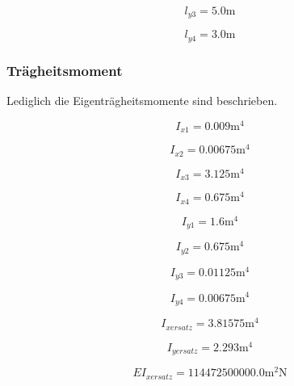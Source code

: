 \documentclass[
  letterpaper,
  DIV=11]{scrreprt}
\begin{document}
\begin{equation*}l_{y3} = 5.0 \text{m}\end{equation*}

\begin{equation*}l_{y4} = 3.0 \text{m}\end{equation*}

\hypertarget{truxe4gheitsmoment}{%
\subsubsection{Trägheitsmoment}\label{truxe4gheitsmoment}}

Lediglich die Eigenträgheitsmomente sind beschrieben.

\begin{equation*}I_{x1} = 0.009 \text{m}^{4}\end{equation*}

\begin{equation*}I_{x2} = 0.00675 \text{m}^{4}\end{equation*}

\begin{equation*}I_{x3} = 3.125 \text{m}^{4}\end{equation*}

\begin{equation*}I_{x4} = 0.675 \text{m}^{4}\end{equation*}

\begin{equation*}I_{y1} = 1.6 \text{m}^{4}\end{equation*}

\begin{equation*}I_{y2} = 0.675 \text{m}^{4}\end{equation*}

\begin{equation*}I_{y3} = 0.01125 \text{m}^{4}\end{equation*}

\begin{equation*}I_{y4} = 0.00675 \text{m}^{4}\end{equation*}

\begin{equation*}I_{x ersatz} = 3.81575 \text{m}^{4}\end{equation*}

\begin{equation*}I_{y ersatz} = 2.293 \text{m}^{4}\end{equation*}

\begin{equation*}EI_{x ersatz} = 114472500000.0 \text{m}^{2} \text{N}\end{equation*}
\end{document}
